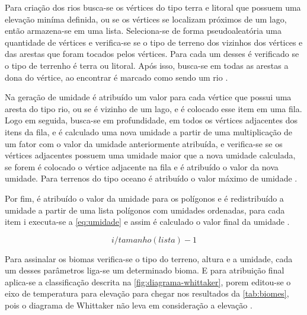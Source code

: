 Para criação dos rios busca-se os vértices do tipo terra e litoral que possuem uma elevação miníma definida, ou se os vértices se localizam próximos de um lago, então armazena-se em uma lista. Seleciona-se de forma pseudoaleatória uma quantidade de vértices e verifica-se se o tipo de terreno dos vizinhos dos vértices e das arestas que foram tocados pelos vértices. Para cada um desses é verificado se o tipo de terrenho é terra ou litoral. Após isso, busca-se em todas as arestas a dona do vértice, ao encontrar é marcado como sendo um rio \cite{amitp2010}.

Na geração de umidade é atribuído um valor para cada vértice que possui uma aresta do tipo rio, ou se é vizinho de um lago, e é colocado esse item em uma fila. Logo em seguida, busca-se em profundidade, em todos os vértices adjacentes dos itens da fila, e é calculado uma nova umidade a partir de uma multiplicação de um fator com o valor da umidade anteriormente atribuída, e verifica-se se os vértices adjacentes possuem uma umidade maior que a nova umidade calculada, se forem é colocado o vértice adjacente na fila e é atribuído o valor da nova umidade. Para terrenos do tipo oceano é atribuído o valor máximo de umidade \cite{amitp2010}.

Por fim, é atribuído o valor da umidade para os polígonos e é redistribuído a umidade a partir de uma lista polígonos com umidades ordenadas, para cada item i executa-se a \cref{eq:umidade} e assim é calculado o valor final da umidade \cite{amitp2010}.

\begin{equation}
	\label{eq:umidade}
	i / tamanho(lista) - 1
\end{equation}


Para assinalar os biomas verifica-se o tipo do terreno, altura e a umidade, cada um desses parâmetros liga-se um determinado bioma. E para atribuição final aplica-se a classificação descrita na \cref{fig:diagrama-whittaker}, porem editou-se o eixo de temperatura para elevação para chegar nos resultados da \cref{tab:biomes}, pois o diagrama de Whittaker não leva em consideração a elevação \cite{amitp2010}.

